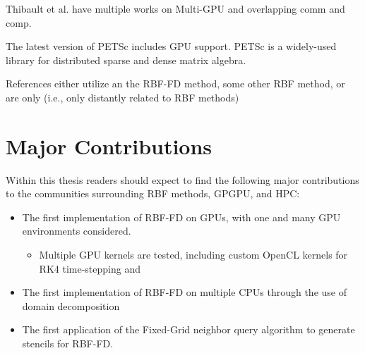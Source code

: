 \documentclass[11pt]{report}
\begin{document}
Thibault et al. have multiple works on Multi-GPU and overlapping comm and comp. 

The latest version of PETSc includes GPU support. PETSc is a widely-used library for distributed sparse and dense matrix algebra. 

References either utilize an the RBF-FD method, some other RBF method, or are only (i.e., only distantly related to RBF methods) 

\cite{Goeddeke2007,Goeddeke2008a,Goeddeke2009a, Goeddeke2008b}




\section{Major Contributions}

Within this thesis readers should expect to find the following major contributions to the communities surrounding RBF methods, GPGPU, and HPC: 
\begin{itemize} 
\item The first implementation of RBF-FD on GPUs, with one and many GPU environments considered. 
\begin{itemize} 
\item Multiple GPU kernels are tested, including custom OpenCL kernels for RK4 time-stepping and 
\end{itemize} 
\item The first implementation of RBF-FD on multiple CPUs through the use of domain decomposition
\item The first application of the Fixed-Grid neighbor query algorithm to generate stencils for RBF-FD. 
\end{itemize}



\ifstandalone


\end{document}
